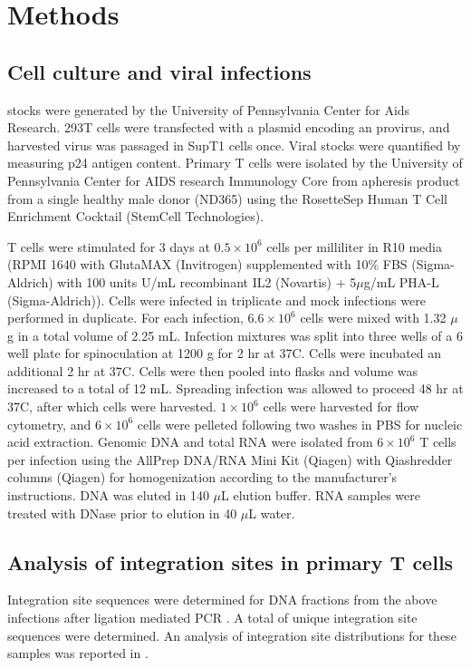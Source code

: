 \documentclass[../sherrill-Mix_thesis.tex]{subfiles}
\begin{document}
\section{Methods}
	\subsection{Cell culture and viral infections}
		\hivEight{} stocks were generated by the University of Pennsylvania Center for Aids Research. 293T cells were transfected with a plasmid encoding an \hivEight{} provirus, and harvested virus was passaged in SupT1 cells once. Viral stocks were quantified by measuring p24 antigen content.  Primary \cdFour{} T cells were isolated by the University of Pennsylvania Center for AIDS research Immunology Core from apheresis product from a single healthy male donor (ND365) using the RosetteSep Human \cdFour{} T Cell Enrichment Cocktail (StemCell Technologies).

		T cells were stimulated for 3 days at $0.5 \times 10^6$ cells per milliliter in R10 media (RPMI 1640 with GlutaMAX (Invitrogen) supplemented with 10\% FBS (Sigma-Aldrich) with 100 units U/mL recombinant IL2 (Novartis) + 5$\mu$g/mL PHA-L (Sigma-Aldrich)).  Cells were infected in triplicate and mock infections were performed in duplicate.  For each infection, $6.6 \times 10^6$ cells were mixed with 1.32 $\mu$g \hivEight{} in a total volume of 2.25 mL.  Infection mixtures was split into three wells of a 6 well plate for spinoculation at 1200 g for 2 hr at 37\degree{}C.  Cells were incubated an additional 2 hr at 37\degree{}C.  Cells were then pooled into flasks and volume was increased to a total of 12 mL.  Spreading infection was allowed to proceed 48 hr at 37\degree{}C, after which cells were harvested.  $1 \times 10^6$ cells were harvested for flow cytometry, and $6 \times 10^6$ cells were pelleted following two washes in PBS for nucleic acid extraction.  Genomic DNA and total RNA were isolated from $6 \times 10^6$ T cells per infection using the AllPrep DNA/RNA Mini Kit (Qiagen) with Qiashredder columns (Qiagen) for homogenization according to the manufacturer's instructions.  DNA was eluted in 140 $\mu$L elution buffer.   RNA samples were treated with DNase prior to elution in 40 $\mu$L water.
		
	\subsection{Analysis of \hivEight{} integration sites in primary T cells}
		Integration site sequences were determined for DNA fractions from the above infections after ligation mediated PCR \citep{Berry2014}. A total of \nIntegrations{} unique integration site sequences were determined. An analysis of integration site distributions for these samples was reported in \citet{Berry2014}. 
\end{document}
